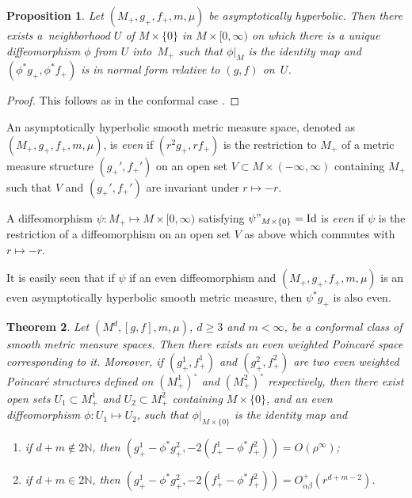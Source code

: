 \documentclass[10pt,a4paper]{amsart}
\newcommand{\psmms}{(M_+,g_+,f_+,m,\mu)}
\numberwithin{equation}{section}
\newtheorem{Theorem}{Theorem}[section]
\newtheorem{Proposition}[Theorem]{Proposition}
 { \theoremstyle{definition}
\newtheorem{Definition}[Theorem]{Definition}
\newtheorem{Note}[Theorem]{Note}
\newtheorem{Example}[Theorem]{Example}
\newtheorem{Remark}[Theorem]{Remark} }
\begin{document}
\begin{Proposition}
Let $\psmms$ be asymptotically hyperbolic. Then there exists a~neigh\-bor\-hood $U$ of $M\times \{0\}$ in $M\times [0,\infty)$ on which there is a unique diffeomorphism $\phi$ from $U$ into~$M_+$ such that ${\phi}|_{M}$ is the identity map and $(\phi^* g_+,\phi^* f_+)$ is in normal form relative to $(g,f)$ on~$U$.
\end{Proposition}
\begin{proof}
This follows as in the conformal case \cite[Proposition 4.3]{FeffermanGraham2012}.
\end{proof}

\begin{Definition}
{\sloppy
An asymptotically hyperbolic smooth metric measure space, denoted as $\psmms$, is \emph{even} if $(r^2 g_+,rf_+)$ is the restriction to $M_+$ of a metric measure structure $(g_+',f_+')$ on an open set $V\subset M\times (-\infty,\infty)$ containing $M_+$ such that $V$ and $(g_+',f_+')$ are invariant under $r\mapsto -r$.

}

A diffeomorphism $\psi\colon M_+\mapsto M\times [0,\infty)$ satisfying ${\psi}"_{{M\times \{0\}}}=\mathrm{Id}$ is \emph{even} if $\psi$ is the restriction of a diffeomorphism on an open set $V$ as above which commutes with $r\mapsto -r$.
\end{Definition}

It is easily seen that if $\psi$ if an even diffeomorphism and $\psmms$ is an even asymptotically hyperbolic smooth metric measure, then $\psi^{*}g_+$ is also even.

\begin{Theorem}
\label{existence-even-poincare}
Let $(M^d,[g,f],m,\mu)$, $d\geq 3$ and $m<\infty$, be a conformal class of smooth metric measure spaces. Then there exists an even weighted Poincar\'e space corresponding to it. Moreover, if $(g_+^1,f_+^1)$ and $(g_+^2,f_+^2)$ are two even weighted Poincar\'e structures defined on $(M_+^1)^{\circ}$ and $(M_+^2)^{\circ}$ respectively, then there exist open sets $U_1\subset M_+^1$ and $U_2\subset M_+^2$ containing $M\times \{0\}$, and an even diffeomorphism $\phi\colon U_1\mapsto U_2$, such that ${\phi}|_{{M\times \{0\}}}$ is the identity map and
\begin{enumerate}[label=$(\roman*)$]\itemsep=0pt

\item if $d+m\notin 2\mathbb{N}$, then $(g_+^1-\phi^*{g_+^2},-2(f_+^1-\phi^*f_+^2))=O(\rho^\infty)$;

\item if $d+m\in 2\mathbb{N}$, then $(g_+^1-\phi^*{g_+^2},-2(f_+^1-\phi^*f_+^2))=O_{\alpha\beta}^+(r^{d+m-2})$.
\end{enumerate}
\end{Theorem}
\end{document}
